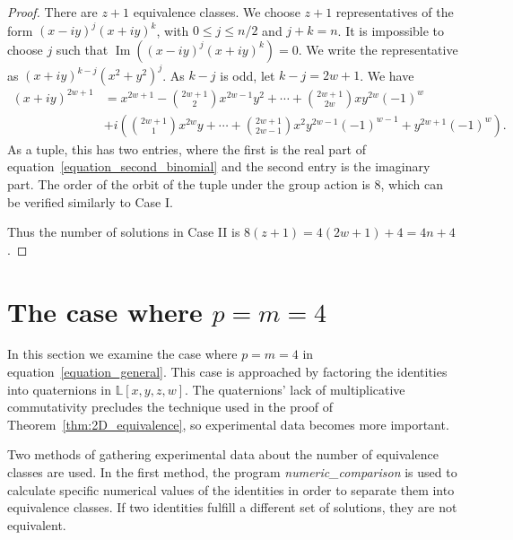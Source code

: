 \documentclass[12pt,table]{article}
\theoremstyle{definition}
\theoremstyle{remark}
\newcommand{\Lll}{\mathbb L}
\newcommand{\myfrac}[2]{#1 / #2}
\numberwithin{equation}{section}
\DeclareMathOperator{\Imag}{Im}
\begin{document}
\begin{proof}
There are $ z + 1 $ equivalence classes. We choose $ z + 1 $
representatives of the form $ (x - iy)^j (x + iy)^k $, with
$ 0 \leq j \leq \myfrac{n}{2}$ and $ j + k = n $.
It is impossible to
choose $ j $ such that $ \Imag\left( (x - iy)^j (x + iy)^k \right) = 0$.
We write the representative as $ (x + iy)^{k-j} (x^2 + y^2)^j $.
As $ k - j $ is odd, let $ k - j = 2w + 1 $. We have
\begin{align}
\label{equation_second_binomial}
(x + iy) ^ {2w + 1} &= x ^ {2w + 1} - \binom{2w+1}{2}  x^{2w - 1 } y^2
+ \dotsb + \binom{2w+1}{2w} x y^{2w} (-1) ^ {w} \nonumber
\\
&+ i \left( \binom{2w+1}{1} x ^ {2w} y + \dotsb +
\binom{2w+1}{2w-1}  x^2 y ^ {2w -1} (-1)^{w-1}
+  y^{2w+1} (-1) ^ {w}
\right).
\end{align}
As a tuple, this has two entries, where the first is the real part
of equation~\eqref{equation_second_binomial} and the second entry
is the imaginary part.
The order of the orbit of the tuple under the group action is 8, which can be
verified similarly to Case I.

Thus the number of solutions in Case II is $ 8(z + 1) = 4 ( 2w + 1) + 4 = 4n + 4 $.
\end{proof}




\section{The case where $p = m = 4$}
\label{sec:4D}

In this section we examine the case where
$p = m = 4$ in equation~\eqref{equation_general}.
This case is approached by factoring the identities
into quaternions in $\Lll[x,y,z,w]$. The quaternions'
lack of multiplicative commutativity precludes the 
technique used in the proof of Theorem~\ref{thm:2D_equivalence},
so experimental data becomes more important.


Two methods of gathering experimental data about the 
number of equivalence classes are used. 
In the first method,
the program \emph{numeric\_comparison}
is used to calculate specific numerical values of 
the identities in order to 
separate them into equivalence classes.
If two identities fulfill
a different set of solutions, they are
not equivalent.
\end{document}

